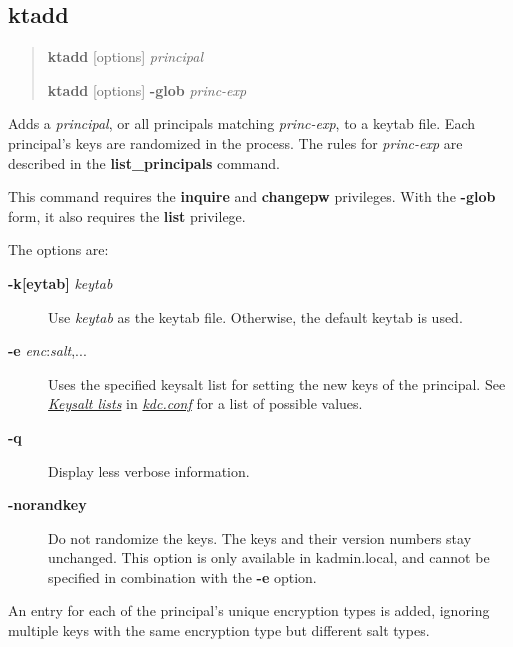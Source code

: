 \documentclass[letterpaper,10pt,english]{sphinxmanual}
\begin{document}
\subsection{ktadd}
\label{admin/appl_servers:ktadd}\begin{quote}

\begin{DUlineblock}{0em}
\item[] \textbf{ktadd} {[}options{]} \emph{principal}
\item[] \textbf{ktadd} {[}options{]} \textbf{-glob} \emph{princ-exp}
\end{DUlineblock}
\end{quote}

Adds a \emph{principal}, or all principals matching \emph{princ-exp}, to a
keytab file.  Each principal's keys are randomized in the process.
The rules for \emph{princ-exp} are described in the \textbf{list\_principals}
command.

This command requires the \textbf{inquire} and \textbf{changepw} privileges.
With the \textbf{-glob} form, it also requires the \textbf{list} privilege.

The options are:
\begin{description}
\item[{\textbf{-k{[}eytab{]}} \emph{keytab}}] \leavevmode
Use \emph{keytab} as the keytab file.  Otherwise, the default keytab is
used.

\item[{\textbf{-e} \emph{enc}:\emph{salt},...}] \leavevmode
Uses the specified keysalt list for setting the new keys of the
principal.  See {\hyperref[admin/conf_files/kdc_conf:keysalt-lists]{\emph{Keysalt lists}}} in {\hyperref[admin/conf_files/kdc_conf:kdc-conf-5]{\emph{kdc.conf}}} for a
list of possible values.

\item[{\textbf{-q}}] \leavevmode
Display less verbose information.

\item[{\textbf{-norandkey}}] \leavevmode
Do not randomize the keys. The keys and their version numbers stay
unchanged.  This option is only available in kadmin.local, and
cannot be specified in combination with the \textbf{-e} option.

\end{description}

An entry for each of the principal's unique encryption types is added,
ignoring multiple keys with the same encryption type but different
salt types.
\end{document}

